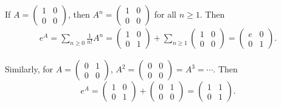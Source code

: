 \begin{example}
If $A = \begin{pmatrix}1 & 0 \\0 & 0 \end{pmatrix}$, then $A^n = \begin{pmatrix} 1 & 0 \\ 0 & 0 \end{pmatrix}$ for all $n \geq 1.$ Then 
\begin{align*}
e^A = \sum_{n \geq 0} \frac{1}{n!}A^n = \begin{pmatrix} 1 & 0 \\ 0 & 1 \end{pmatrix} + \sum_{n \geq 1} \begin{pmatrix} 1 & 0 \\ 0 & 0 \end{pmatrix} = \begin{pmatrix} e & 0 \\ 0 & 1 \end{pmatrix}.
\end{align*}
\end{example}

\begin{example}
Similarly, for $A = \begin{pmatrix} 0 & 1 \\ 0 & 0 \end{pmatrix}$, $A^2 = \begin{pmatrix} 0 & 0 \\ 0 & 0 \end{pmatrix} = A^3 = \cdots$. Then \[e^A = \begin{pmatrix} 1 & 0 \\ 0 & 1 \end{pmatrix} + \begin{pmatrix} 0 & 1 \\ 0 & 0 \end{pmatrix} = \begin{pmatrix} 1 & 1 \\ 0 & 1 \end{pmatrix}.\]
\end{example}

